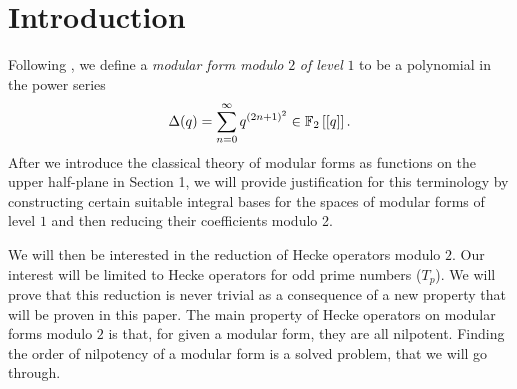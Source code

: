 \setcounter{section}{-1}
\section{Introduction}

Following \cite{OrdreNilpotenceOperateurHecke}, we define a \textit{modular form modulo} $2$ \textit{of level} $1$ to be a polynomial in the power series 
$$
\Delta(q) = \sum_{n = 0}^{\infty}q^{(2n+1)^2} \in \mathbb{F}_2\left[\left[ q \right]\right].
$$
After we introduce the classical theory of modular forms as functions on the upper half-plane in Section 1, we will provide justification for this terminology by constructing certain suitable integral bases for the spaces of modular forms of level $1$ and then reducing their coefficients modulo 2.

We will then be interested in the reduction of Hecke operators modulo $2$.
Our interest will be limited to Hecke operators for odd prime numbers ($T_p$).
We will prove that this reduction is never trivial as a consequence of a new property that will be proven in this paper.
The main property of Hecke operators on modular forms modulo $2$ is that, for given a modular form, they are all nilpotent.
Finding the order of nilpotency of a modular form is a solved problem, that we will go through.

